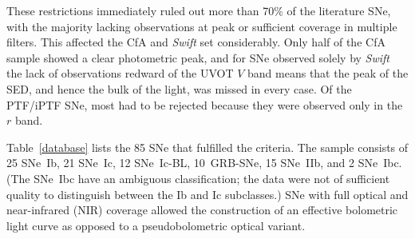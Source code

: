 \documentclass[a4paper,fleqn,usenatbib]{mnras}
\begin{document}
These restrictions immediately ruled out more than 70$\%$ of the literature SNe, with the majority lacking observations at peak or sufficient coverage in multiple filters. This affected the CfA and \textit{Swift} set considerably. Only half of the CfA sample showed a clear photometric peak, and for SNe observed solely by \textit{Swift} the lack of observations redward of the UVOT $V$ band means that the peak of the SED, and hence the bulk of the light, was missed in every case. Of the PTF/iPTF SNe, most had to be rejected because they were observed only in the $r$ band. 

Table~\ref{database} lists the 85 SNe that fulfilled the criteria. The sample consists of 25 SNe~Ib, 21 SNe~Ic, 12 SNe~Ic-BL, 10~GRB-SNe, 15 SNe~IIb, and 2 SNe~Ibc. (The SNe~Ibc have an ambiguous classification; the data were not of sufficient quality to distinguish between the Ib and Ic subclasses.) 
 SNe with full optical and near-infrared (NIR) coverage allowed the construction of an effective bolometric light curve as opposed to a pseudobolometric optical variant. 
\end{document}
